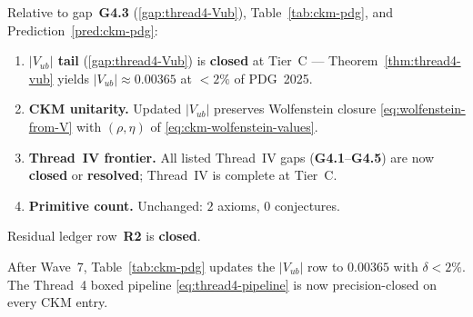 \begin{corollary}
\label{cor:thread4-wave7-closure}
Relative to gap~\textbf{G4.3} (\ref{gap:thread4-Vub}),
Table~\ref{tab:ckm-pdg}, and Prediction~\ref{pred:ckm-pdg}:
\begin{enumerate}[label=(\roman*),leftmargin=*]
  \item \textbf{$|V_{ub}|$ tail}
    (\ref{gap:thread4-Vub}) is \textbf{closed} at Tier~C ---
    Theorem~\ref{thm:thread4-vub} yields $|V_{ub}|\approx 0.00365$ at
    $<2\%$ of PDG~2025.
  \item \textbf{CKM unitarity.}
    Updated $|V_{ub}|$ preserves Wolfenstein closure
    \eqref{eq:wolfenstein-from-V} with
    $(\rho,\eta)$ of \eqref{eq:ckm-wolfenstein-values}.
  \item \textbf{Thread~IV frontier.}
    All listed Thread~IV gaps (\textbf{G4.1}--\textbf{G4.5}) are now
    \textbf{closed} or \textbf{resolved}; Thread~IV is complete at Tier~C.
  \item \textbf{Primitive count.}
    Unchanged: $2$ axioms, $0$ conjectures.
\end{enumerate}
Residual ledger row~\textbf{R2} is \textbf{closed}.
\end{corollary}

\begin{remark}
\label{rmk:thread4-wave7-table}
After Wave~7, Table~\ref{tab:ckm-pdg} updates the $|V_{ub}|$ row to
$0.00365$ with $\delta<2\%$. The Thread~4 boxed pipeline
\eqref{eq:thread4-pipeline} is now precision-closed on every CKM entry.
\end{remark}